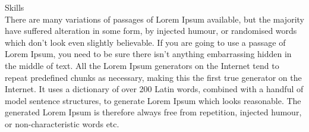 \documentclass{letter}
\newcommand{\header}[1]{\vspace{0.5cm}\noindent\textcolor{NavyBlue}{\Large{#1}}\\\indent}
\begin{document}
\header{Skills}
There are many variations of passages of Lorem Ipsum available, but the majority have suffered alteration in some form, by injected humour, or randomised words which don't look even slightly believable. If you are going to use a passage of Lorem Ipsum, you need to be sure there isn't anything embarrassing hidden in the middle of text. All the Lorem Ipsum generators on the Internet tend to repeat predefined chunks as necessary, making this the first true generator on the Internet. It uses a dictionary of over 200 Latin words, combined with a handful of model sentence structures, to generate Lorem Ipsum which looks reasonable. The generated Lorem Ipsum is therefore always free from repetition, injected humour, or non-characteristic words etc.
\end{document}
